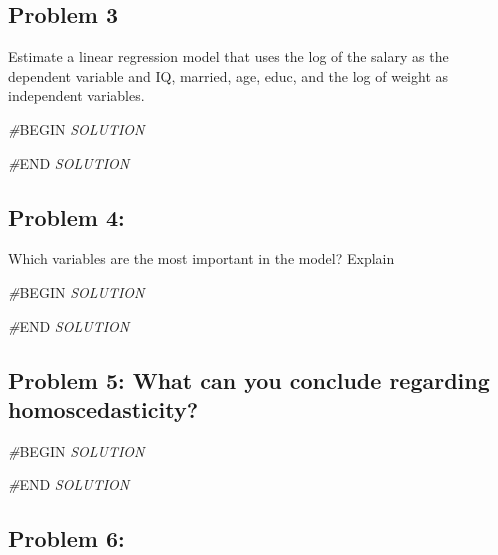 \documentclass[
]{article}
\newenvironment{Shaded}{\begin{snugshade}}{\end{snugshade}}
\newcommand{\CommentTok}[1]{\textcolor[rgb]{0.56,0.35,0.01}{\textit{#1}}}
\newcommand{\RegionMarkerTok}[1]{#1}
\begin{document}
\hypertarget{problem-3}{%
\subsection{Problem 3}\label{problem-3}}

Estimate a linear regression model that uses the log of the salary as
the dependent variable and IQ, married, age, educ, and the log of weight
as independent variables.

\begin{Shaded}
\begin{Highlighting}[]
\CommentTok{\#}\RegionMarkerTok{BEGIN}\CommentTok{ SOLUTION}


\CommentTok{\#}\RegionMarkerTok{END}\CommentTok{ SOLUTION}
\end{Highlighting}
\end{Shaded}

\hypertarget{problem-4}{%
\subsection{Problem 4:}\label{problem-4}}

Which variables are the most important in the model? Explain

\begin{Shaded}
\begin{Highlighting}[]
\CommentTok{\#}\RegionMarkerTok{BEGIN}\CommentTok{ SOLUTION}


\CommentTok{\#}\RegionMarkerTok{END}\CommentTok{ SOLUTION}
\end{Highlighting}
\end{Shaded}

\hypertarget{problem-5-what-can-you-conclude-regarding-homoscedasticity}{%
\subsection{Problem 5: What can you conclude regarding
homoscedasticity?}\label{problem-5-what-can-you-conclude-regarding-homoscedasticity}}

\begin{Shaded}
\begin{Highlighting}[]
\CommentTok{\#}\RegionMarkerTok{BEGIN}\CommentTok{ SOLUTION}


\CommentTok{\#}\RegionMarkerTok{END}\CommentTok{ SOLUTION}
\end{Highlighting}
\end{Shaded}

\hypertarget{problem-6}{%
\subsection{Problem 6:}\label{problem-6}}
\end{document}

